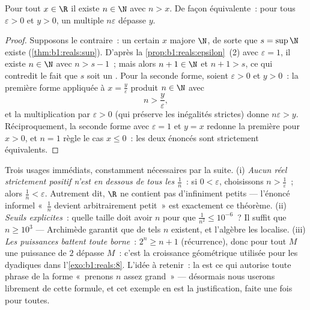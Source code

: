 \begin{theorem}\label{thm:b1:reals:archimedes}
Pour tout $x \in \R$ il existe $n \in \N$ avec $n > x$. De façon
équivalente~: pour tous $\varepsilon > 0$ et $y > 0$, un multiple
$n\varepsilon$ dépasse $y$.
\end{theorem}

\begin{proof}
Supposons le contraire~: un certain $x$ majore $\N$, de sorte que
$s = \sup \N$ existe (\cref{thm:b1:reals:sup}). D'après la
\cref{prop:b1:reals:epsilon}~(2) avec $\varepsilon = 1$, il existe $n
\in \N$ avec $n > s - 1$~; mais alors $n + 1 \in \N$ et $n + 1 > s$,
ce qui contredit le fait que $s$ soit un . Pour la seconde
forme, soient $\varepsilon > 0$ et $y > 0$~: la première forme
appliquée à $x = \frac{y}{\varepsilon}$ produit $n \in \N$ avec
\[
n > \frac{y}{\varepsilon},
\]
et la multiplication par $\varepsilon > 0$ (qui préserve les
inégalités strictes) donne $n\varepsilon > y$.
Réciproquement, la seconde forme avec $\varepsilon = 1$ et $y = x$
redonne la première pour $x > 0$, et $n = 1$ règle le cas $x \leq 0$~:
les deux énoncés sont strictement équivalents.
\end{proof}

\begin{example}\label{ex:b1:reals:archimedeswork}
Trois usages immédiats, constamment nécessaires par la suite. (i)
\emph{Aucun réel strictement positif n'est en dessous de tous les
$\frac1n$}~: si $0 < \varepsilon$, choisissons $n >
\frac1\varepsilon$~; alors $\frac1n < \varepsilon$. Autrement dit,
$\R$ ne contient pas d'infiniment petits --- l'énoncé informel
«~$\frac1n$ devient arbitrairement petit~» est exactement ce
théorème. (ii) \emph{Seuils explicites}~: quelle taille doit avoir
$n$ pour que $\frac{1}{n^2} \leq 10^{-6}$~? Il suffit que $n \geq
10^3$ --- Archimède garantit que de tels $n$ existent, et l'algèbre
les localise. (iii) \emph{Les puissances battent toute borne}~:
$2^n \geq n + 1$ (récurrence), donc pour tout $M$ une puissance de
$2$ dépasse $M$~: c'est la croissance géométrique utilisée pour les
dyadiques dans l'\cref{exo:b1:reals:8}. L'idée à retenir~: la
 est ce qui autorise toute phrase de la forme
«~prenons $n$ assez grand~» --- désormais nous userons librement de
cette formule, et cet exemple en est la justification, faite une
fois pour toutes.
\end{example}

